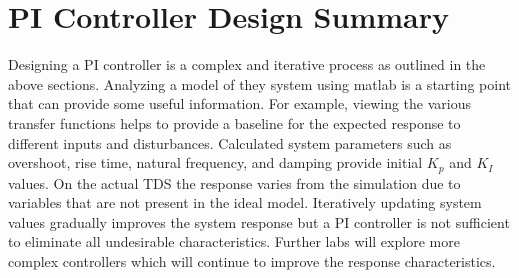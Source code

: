 \documentclass[11pt,titlepage]{article}
\begin{document}
\section{PI Controller Design Summary}
    Designing a PI controller is a complex and iterative process as outlined in the above sections. Analyzing a model of they system using matlab is a starting point that can provide some useful information. For example, viewing the various transfer functions helps to provide a baseline for the expected response to different inputs and disturbances. Calculated system parameters such as overshoot, rise time, natural frequency, and damping provide initial $K_p$ and $K_I$ values. On the actual TDS the response varies from the simulation due to variables that are not present in the ideal model. Iteratively updating system values gradually improves the system response but a PI controller is not sufficient to eliminate all undesirable characteristics. Further labs will explore more complex controllers which will continue to improve the response characteristics.
\end{document}
